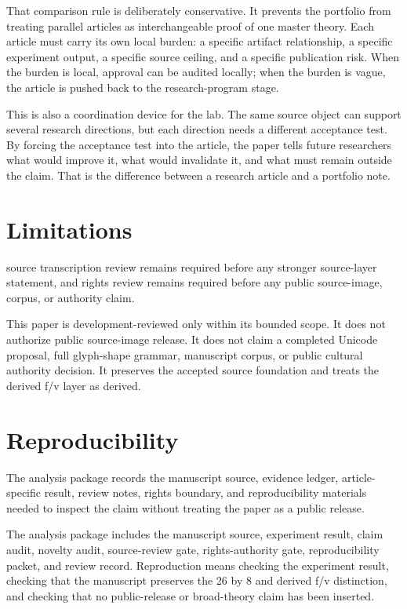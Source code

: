 \documentclass[sigconf,nonacm]{acmart}
\begin{document}
That comparison rule is deliberately conservative. It prevents the portfolio
from treating parallel articles as interchangeable proof of one master theory.
Each article must carry its own local burden: a specific artifact relationship,
a specific experiment output, a specific source ceiling, and a specific
publication risk. When the burden is local, approval can be audited locally; when
the burden is vague, the article is pushed back to the research-program stage.

This is also a coordination device for the lab. The same source object can
support several research directions, but each direction needs a different
acceptance test. By forcing the acceptance test into the article, the paper tells
future researchers what would improve it, what would invalidate it, and what
must remain outside the claim. That is the difference between a research article
and a portfolio note.

\section{Limitations}
source transcription review remains required before any stronger source-layer statement, and rights review remains required before any public source-image, corpus, or authority claim. 

This paper is development-reviewed only within its bounded scope. It does not
authorize public source-image release. It does not claim a completed Unicode
proposal, full glyph-shape grammar, manuscript corpus, or public cultural
authority decision. It preserves the accepted source foundation and treats the
derived f/v layer as derived.

\section{Reproducibility}
The analysis package records the manuscript source, evidence ledger, article-specific result, review notes, rights boundary, and reproducibility materials needed to inspect the claim without treating the paper as a public release. 

The analysis package includes the manuscript source, experiment result, claim
audit, novelty audit, source-review gate, rights-authority gate,
reproducibility packet, and review record. Reproduction means checking the
experiment result, checking that the manuscript preserves the 26 by 8 and
derived f/v distinction, and checking that no public-release or broad-theory
claim has been inserted.
\end{document}
